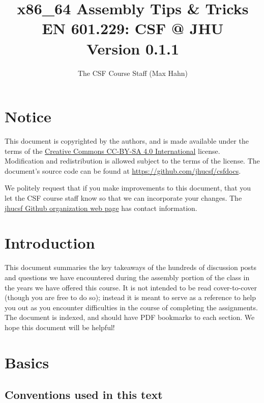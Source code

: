 \documentclass[11pt]{article}
\begin{document}
\title{x86\_64 Assembly Tips \& Tricks \\
\large EN 601.229: CSF @ JHU\\
Version 0.1.1}
\author{The CSF Course Staff (Max Hahn)}
\maketitle

\tableofcontents
\newpage

\section{Notice}

This document is copyrighted by the authors, and is
made available under the terms of the
\href{https://creativecommons.org/licenses/by-sa/4.0/}{Creative Commons CC-BY-SA 4.0 International}
license. Modification and redistribution is allowed subject to the terms
of the license. The document's source code can be found at
\url{https://github.com/jhucsf/csfdocs}.

We politely request that if you make improvements to this document,
that you let the CSF course staff know so that we can incorporate your
changes. The \href{https://github.com/jhucsf}{jhucsf Github organization web page}
has contact information.

\newpage

\section{Introduction}

This document summaries the key takeaways of the hundreds of discussion posts and questions we
have encountered during the assembly portion of the class in the years we have offered
this course. It is not intended to be read cover-to-cover (though you are free to do so);
instead it is meant to serve as a reference to help you out as you encounter difficulties
in the course of completing the assignments. The document is indexed, and should have PDF
bookmarks to each section. We hope this document will be helpful!

\section{Basics}

\subsection{Conventions used in this text}
\end{document}
